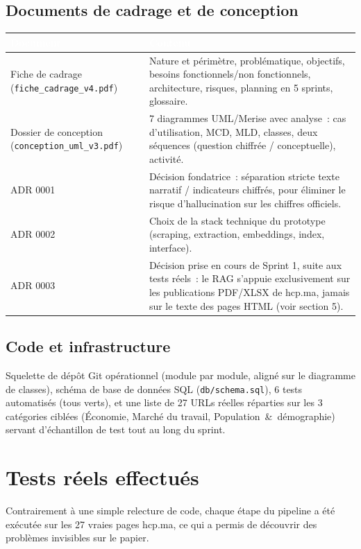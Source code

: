 \documentclass[11pt,a4paper]{article}
\newcommand{\tblhead}[1]{\textcolor{white}{\textbf{#1}}}
\begin{document}
\subsection{Documents de cadrage et de conception}
\begin{longtable}{@{}p{5.5cm}p{9.7cm}@{}}
\rowcolor{navy}
\tblhead{Document} & \tblhead{Contenu} \\
\midrule
\endhead
Fiche de cadrage (\texttt{fiche\_cadrage\_v4.pdf}) & Nature et p\'erim\`etre, probl\'ematique, objectifs, besoins fonctionnels/non fonctionnels, architecture, risques, planning en 5 sprints, glossaire. \\
Dossier de conception (\texttt{conception\_uml\_v3.pdf}) & 7 diagrammes UML/Merise avec analyse~: cas d'utilisation, MCD, MLD, classes, deux s\'equences (question chiffr\'ee / conceptuelle), activit\'e. \\
ADR 0001 & D\'ecision fondatrice~: s\'eparation stricte texte narratif / indicateurs chiffr\'es, pour \'eliminer le risque d'hallucination sur les chiffres officiels. \\
ADR 0002 & Choix de la stack technique du prototype (scraping, extraction, embeddings, index, interface). \\
ADR 0003 & D\'ecision prise en cours de Sprint 1, suite aux tests r\'eels~: le RAG s'appuie exclusivement sur les publications PDF/XLSX de hcp.ma, jamais sur le texte des pages HTML (voir section 5). \\
\end{longtable}

\subsection{Code et infrastructure}
Squelette de d\'ep\^ot Git op\'erationnel (module par module, align\'e sur le diagramme de classes), sch\'ema de base de donn\'ees SQL (\texttt{db/schema.sql}), 6 tests automatis\'es (tous verts), et une liste de 27 URLs r\'eelles r\'eparties sur les 3 cat\'egories cibl\'ees (\'Economie, March\'e du travail, Population~\&~d\'emographie) servant d'\'echantillon de test tout au long du sprint.

\section{Tests r\'eels effectu\'es}
Contrairement \`a une simple relecture de code, chaque \'etape du pipeline a \'et\'e ex\'ecut\'ee sur les 27 vraies pages hcp.ma, ce qui a permis de d\'ecouvrir des probl\`emes invisibles sur le papier.
\end{document}
